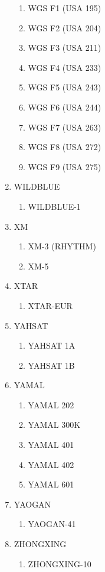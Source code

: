 \begin{multicols}{2}
\begin{enumerate}
  \begin{enumerate}
    \item WGS F1 (USA 195)
    \item WGS F2 (USA 204)
    \item WGS F3 (USA 211)
    \item WGS F4 (USA 233)
    \item WGS F5 (USA 243)
    \item WGS F6 (USA 244)
    \item WGS F7 (USA 263)
    \item WGS F8 (USA 272)
    \item WGS F9 (USA 275)
  \end{enumerate}
  \item WILDBLUE
  \begin{enumerate}
    \item WILDBLUE-1
  \end{enumerate}
  \item XM
  \begin{enumerate}
    \item XM-3 (RHYTHM)
    \item XM-5
  \end{enumerate}
  \item XTAR
  \begin{enumerate}
    \item XTAR-EUR
  \end{enumerate}
  \item YAHSAT
  \begin{enumerate}
    \item YAHSAT 1A
    \item YAHSAT 1B
  \end{enumerate}
  \item YAMAL
  \begin{enumerate}
    \item YAMAL 202
    \item YAMAL 300K
    \item YAMAL 401
    \item YAMAL 402
    \item YAMAL 601
  \end{enumerate}
  \item YAOGAN
  \begin{enumerate}
    \item YAOGAN-41
  \end{enumerate}
  \item ZHONGXING
  \begin{enumerate}
    \item ZHONGXING-10

\end{enumerate}
\end{enumerate}
\end{multicols}

